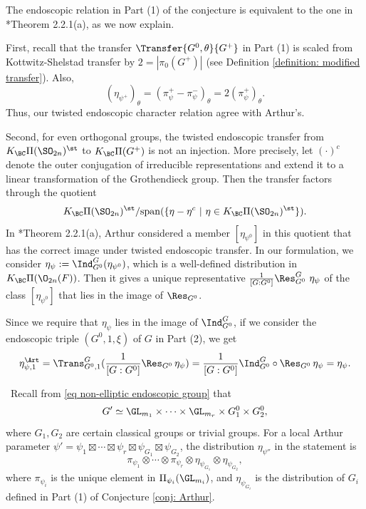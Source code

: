 \documentclass[11pt,letterpaper]{amsart}
\numberwithin{equation}{section}
\begin{document}
 
The endoscopic relation in Part (1) of the conjecture is equivalent to the one in \cite{Art13}*{Theorem 2.2.1(a)}, as we now explain.

    First, recall that the transfer $\Transfer{G^0,\theta}{G^+}$ in Part (1) is scaled from Kottwitz-Shelstad transfer by $2=|\pi_0(G^+)|$ (see Definition \ref{definition: modified transfer}). Also,
\[ 
(\eta_{\psi^+})_{\theta}
= 
(\pi_{\psi}^+ - \pi_{\psi}^-)_{\theta}= 2 (\pi_{\psi}^+)_{\theta}.\]
Thus, our twisted endoscopic character relation agree with Arthur's.

Second, for even orthogonal groups, the twisted endoscopic transfer from $K_{\BC}\Pi(\SO_{2n})^{\st}$ to $K_{\BC}\Pi(G^+)$ is not an injection. More precisely, let $(\cdot)^c$ denote the outer conjugation of irreducible representations and extend it to a linear transformation of the Grothendieck group. Then the transfer factors through the quotient
\[K_{\BC}\Pi(\SO_{2n})^{\st}/\mathrm{span}(\{ \eta -\eta^c\ | \ \eta \in K_{\BC}\Pi(\SO_{2n})^{\st}\}).\]
In \cite{Art13}*{Theorem 2.2.1(a)}, Arthur considered a member $[\eta_{\psi^0}]$ in this quotient
that has the correct image under twisted endoscopic transfer. In our formulation, we consider $\eta_{\psi}:= \Ind_{G^0}^G(\eta_{\psi^0})$, which is a well-defined distribution in $K_{\BC}\Pi(\O_{2n}(F))$. Then it gives a unique representative $\frac{1}{[G:G^0]}\Res_{G^0}^{G}\ \eta_{\psi}$ of the class $[\eta_{\psi^0}]$ that lies in the image of $\Res_{G^0}$.

Since we require that $\eta
_{\psi}$ lies in the image of $\Ind_{G^0}^G$, if we consider the endoscopic triple $(G^0, 1 , \xi)$ of $G$ in Part (2), we get 
\[ \eta_{\psi,1}^{\Art}= \Trans_{G^0,1}^{G} (\frac{1}{[G:G^0]}\Res_{G^0}\, \eta_{\psi})=\frac{1}{[G:G^0]} \Ind_{G^0}^{G} \circ \Res_{G^0}\,  \eta_{\psi}= \eta_{\psi}.\]



\begin{remark}
\label{rmk Arthur packet def}\ Recall from \eqref{eq non-elliptic endoscopic group} that
\[G' \simeq \GL_{m_1} \times \cdots \times \GL_{m_r} \times G_1^{0} \times G_2^0,\]
where $G_1, G_2$ are certain classical groups or trivial groups. For a local Arthur parameter $\psi'= \psi_1 \boxtimes \cdots \boxtimes \psi_r \boxtimes \psi_{G_1} \boxtimes \psi_{G_2}$, the distribution $\eta_{\psi''}$ in the statement is 
\[ \pi_{\psi_1} \otimes \cdots \otimes \pi_{\psi_r} \otimes \eta_{\psi_{G_1}} \otimes \eta_{\psi_{G_2}} , \]
where $\pi_{\psi_i}$ is the unique element in $\Pi_{\psi_i}(\GL_{m_i})$, and $\eta_{\psi_{G_i}}$ is the distribution of $G_i$ defined in Part (1) of Conjecture \ref{conj: Arthur}.
\end{remark}
\end{document}
